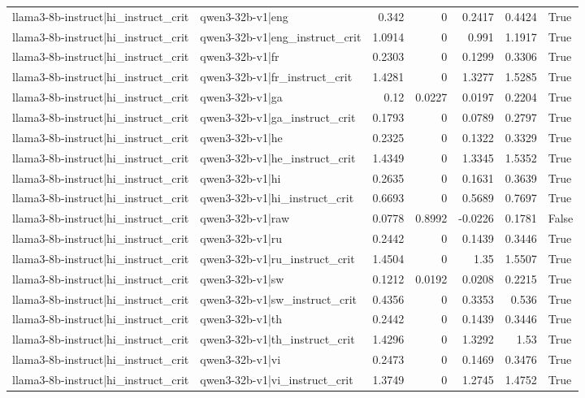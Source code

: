 \begin{table}
\begin{tabular}{l l r r r r l}
llama3-8b-instruct|hi_instruct_crit & qwen3-32b-v1|eng & 0.342 & 0 & 0.2417 & 0.4424 & True \\
llama3-8b-instruct|hi_instruct_crit & qwen3-32b-v1|eng_instruct_crit & 1.0914 & 0 & 0.991 & 1.1917 & True \\
llama3-8b-instruct|hi_instruct_crit & qwen3-32b-v1|fr & 0.2303 & 0 & 0.1299 & 0.3306 & True \\
llama3-8b-instruct|hi_instruct_crit & qwen3-32b-v1|fr_instruct_crit & 1.4281 & 0 & 1.3277 & 1.5285 & True \\
llama3-8b-instruct|hi_instruct_crit & qwen3-32b-v1|ga & 0.12 & 0.0227 & 0.0197 & 0.2204 & True \\
llama3-8b-instruct|hi_instruct_crit & qwen3-32b-v1|ga_instruct_crit & 0.1793 & 0 & 0.0789 & 0.2797 & True \\
llama3-8b-instruct|hi_instruct_crit & qwen3-32b-v1|he & 0.2325 & 0 & 0.1322 & 0.3329 & True \\
llama3-8b-instruct|hi_instruct_crit & qwen3-32b-v1|he_instruct_crit & 1.4349 & 0 & 1.3345 & 1.5352 & True \\
llama3-8b-instruct|hi_instruct_crit & qwen3-32b-v1|hi & 0.2635 & 0 & 0.1631 & 0.3639 & True \\
llama3-8b-instruct|hi_instruct_crit & qwen3-32b-v1|hi_instruct_crit & 0.6693 & 0 & 0.5689 & 0.7697 & True \\
llama3-8b-instruct|hi_instruct_crit & qwen3-32b-v1|raw & 0.0778 & 0.8992 & -0.0226 & 0.1781 & False \\
llama3-8b-instruct|hi_instruct_crit & qwen3-32b-v1|ru & 0.2442 & 0 & 0.1439 & 0.3446 & True \\
llama3-8b-instruct|hi_instruct_crit & qwen3-32b-v1|ru_instruct_crit & 1.4504 & 0 & 1.35 & 1.5507 & True \\
llama3-8b-instruct|hi_instruct_crit & qwen3-32b-v1|sw & 0.1212 & 0.0192 & 0.0208 & 0.2215 & True \\
llama3-8b-instruct|hi_instruct_crit & qwen3-32b-v1|sw_instruct_crit & 0.4356 & 0 & 0.3353 & 0.536 & True \\
llama3-8b-instruct|hi_instruct_crit & qwen3-32b-v1|th & 0.2442 & 0 & 0.1439 & 0.3446 & True \\
llama3-8b-instruct|hi_instruct_crit & qwen3-32b-v1|th_instruct_crit & 1.4296 & 0 & 1.3292 & 1.53 & True \\
llama3-8b-instruct|hi_instruct_crit & qwen3-32b-v1|vi & 0.2473 & 0 & 0.1469 & 0.3476 & True \\
llama3-8b-instruct|hi_instruct_crit & qwen3-32b-v1|vi_instruct_crit & 1.3749 & 0 & 1.2745 & 1.4752 & True \\

\end{tabular}
\end{table}

